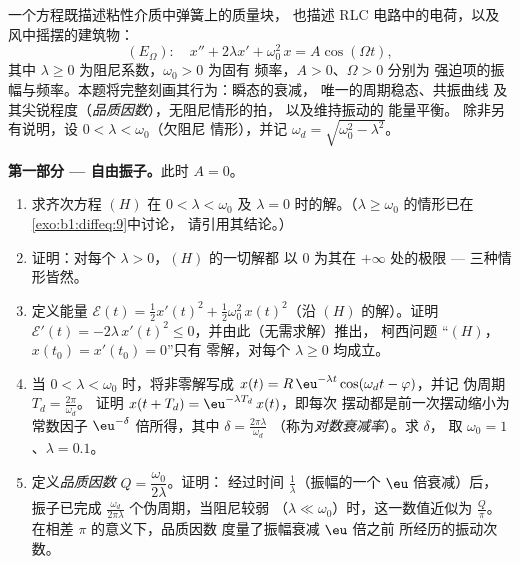 \begin{problem}\label{pb:b1:diffeq:1}
一个方程既描述粘性介质中弹簧上的质量块，
也描述 RLC 电路中的电荷，以及风中摇摆的建筑物：
\[
(E_\Omega)\colon\quad
x'' + 2\lambda x' + \omega_0^2\,x = A\cos(\Omega t),
\]
其中 $\lambda \geq 0$ 为阻尼系数，$\omega_0 > 0$ 为固有
频率，$A > 0$、$\Omega > 0$ 分别为
强迫项的振幅与频率。本题将完整刻画其行为：瞬态的衰减，
唯一的周期稳态、共振曲线
及其尖锐程度（\emph{品质因数}），无阻尼情形的拍，
以及维持振动的
能量平衡。
除非另有说明，设 $0 < \lambda < \omega_0$（欠阻尼
情形），并记 $\omega_d = \sqrt{\omega_0^2 - \lambda^2}$。

\medskip
\noindent\textbf{第一部分 --- 自由振子。}此时 $A = 0$。
\begin{enumerate}
  \item 求齐次方程 $(H)$ 在 $0 < \lambda <
        \omega_0$ 及 $\lambda = 0$ 时的解。（$\lambda
        \geq \omega_0$ 的情形已在\cref{exo:b1:diffeq:9}中讨论，
        请引用其结论。）
  \item 证明：对每个 $\lambda > 0$，$(H)$ 的一切解都
        以 $0$ 为其在 $+\infty$ 处的极限 --- 三种情形皆然。
  \item 定义能量 $\mathcal E(t) = \frac12 x'(t)^2 +
        \frac12\omega_0^2\,x(t)^2$（沿 $(H)$ 的解）。证明
        $\mathcal E'(t) = -2\lambda\,x'(t)^2 \leq 0$，并由此（无需求解）推出，
        柯西问题
        “$(H)$，$x(t_0) = x'(t_0) = 0$”只有
        零解，对每个 $\lambda \geq 0$ 均成立。
  \item 当 $0 < \lambda < \omega_0$ 时，将非零解写成
        $x(t) = R\,\eu^{-\lambda t}\cos(\omega_d t - \varphi)$，并记
        伪周期 $T_d = \frac{2\pi}{\omega_d}$。
        证明 $x(t + T_d) = \eu^{-\lambda T_d}\,x(t)$，即每次
        摆动都是前一次摆动缩小为常数因子
        $\eu^{-\delta}$ 倍所得，其中 $\delta = \frac{2\pi\lambda}{\omega_d}$
        （称为\emph{对数衰减率}）。求 $\delta$，
        取 $\omega_0 = 1$、$\lambda = 0.1$。
  \item 定义\emph{品质因数} $Q =
        \dfrac{\omega_0}{2\lambda}$。证明：
        经过时间 $\frac1\lambda$（振幅的一个 $\eu$ 倍衰减）后，
        振子已完成
        $\frac{\omega_d}{2\pi\lambda}$ 个伪周期，当阻尼较弱
        （$\lambda \ll \omega_0$）时，这一数值近似为
        $\frac Q\pi$。在相差 $\pi$ 的意义下，品质因数
        度量了振幅衰减 $\eu$ 倍之前
        所经历的振动次数。
\end{enumerate}


\end{problem}
